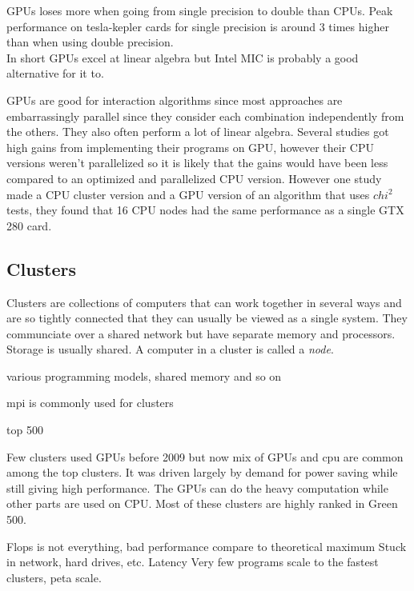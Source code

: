 \documentclass[10pt,a4paper]{report}
\begin{document}
GPUs loses more when going from single precision to double than CPUs. Peak performance on tesla-kepler cards for single precision is around 3 times higher than when using double precision\cite{nvtesla}.\\

In short GPUs excel at linear algebra but Intel MIC is probably a good alternative for it to.

GPUs are good for interaction algorithms since most approaches are embarrassingly parallel since they consider each combination independently from the others. They also often perform a lot of linear algebra. Several studies got high gains from implementing their programs on GPU, however their CPU versions weren't parallelized so it is likely that the gains would have been less compared to an optimized and parallelized CPU version.\cite{gwis,gboost,gmdr_gpu,cuda_lr,genie_2012,plink_gpu} However one study made a CPU cluster version and a GPU version of an algorithm that uses $chi^2$ tests, they found that 16 CPU nodes had the same performance as a single GTX 280 card\cite{jiang_accelerating}.

\subsection{Clusters}

Clusters are collections of computers that can work together in several ways and are so tightly connected that they can usually be viewed as a single system. They communciate over a shared network but have separate memory and processors. Storage is usually shared. A computer in a cluster is called a \emph{node}. \cite{intro_hpc, kirk2012programming}

various programming models, shared memory and so on

mpi is commonly used for clusters\cite{kirk2012programming}

top 500\cite{TOP500}

Few clusters used GPUs before 2009 but now mix of GPUs and cpu are common among the top clusters. It was driven largely by demand for power saving while still giving high performance. The GPUs can do the heavy computation while other parts are used on CPU. Most of these clusters are highly ranked in Green 500. \cite{kirk2012programming}

Flops is not everything, bad performance compare to theoretical maximum
Stuck in network, hard drives, etc. Latency
Very few programs scale to the fastest clusters, peta scale.
\end{document}
